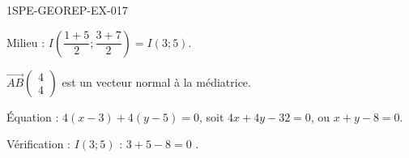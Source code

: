 \begin{corrige}{1SPE-GEOREP-EX-017}


Milieu : $I\!\left(\dfrac{1+5}{2} ; \dfrac{3+7}{2}\right) = I(3 ; 5)$.

$\vec{AB}\begin{pmatrix} 4 \\ 4 \end{pmatrix}$ est un vecteur normal à la médiatrice.

Équation : $4(x - 3) + 4(y - 5) = 0$, soit $4x + 4y - 32 = 0$, ou $\boxed{x + y - 8 = 0}$.

Vérification : $I(3 ; 5)$ : $3 + 5 - 8 = 0$ \checkmark.

\end{corrige}
